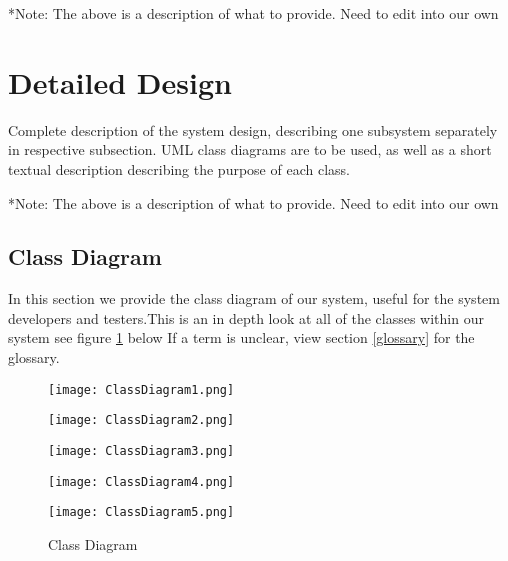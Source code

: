 \documentclass[12pt]{article}
\begin{document}
*Note: The above is a description of what to provide. Need to edit into our own


\section{Detailed Design} \label{sec:detail}

Complete description of the system design, describing one subsystem separately in respective subsection.
UML class diagrams are to be used, as well as a short textual description describing the purpose of each class.

*Note: The above is a description of what to provide. Need to edit into our own

\subsection{Class Diagram}

In this section we provide the class diagram of our system, useful for the system developers and testers.This is an in depth look at all of the classes within our system see figure \ref{fig:class-diagram} below If a term is unclear, view section \ref{glossary} for the glossary.

\begin{figure}[H]
\texttt{[image: ClassDiagram1.png]}
\end{figure}

\begin{figure}[H]
\texttt{[image: ClassDiagram2.png]}
\end{figure}

\begin{figure}[H]
\texttt{[image: ClassDiagram3.png]}
\end{figure}

\begin{figure}[H]
\texttt{[image: ClassDiagram4.png]}
\end{figure}

\begin{figure}[H]
\texttt{[image: ClassDiagram5.png]}
\caption{Class Diagram}
\label{fig:class-diagram}
\end{figure}


\clearpage
\end{document}
